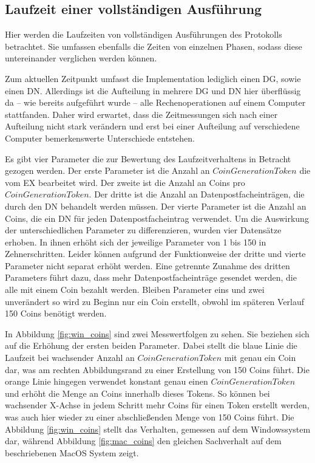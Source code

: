 \documentclass[
	fontsize=11pt,
	headings=small,
	parskip=half,           %
	bibliography=totoc,
	numbers=noenddot,       %
	open=any,               %
]{scrreprt}
\begin{document}
\subsection{Laufzeit einer vollständigen Ausführung}
\label{subsec:fullRuntime}
Hier werden die Laufzeiten von vollständigen Ausführungen des Protokolls betrachtet. Sie umfassen ebenfalls die Zeiten von einzelnen Phasen, sodass diese untereinander verglichen werden können.

Zum aktuellen Zeitpunkt umfasst die Implementation lediglich einen DG, sowie einen DN. Allerdings ist die Aufteilung in mehrere DG und DN hier überflüssig da -- wie bereits aufgeführt wurde -- alle Rechenoperationen auf einem Computer stattfanden. Daher wird erwartet, dass die Zeitmessungen sich nach einer Aufteilung nicht stark verändern und erst bei einer Aufteilung auf verschiedene Computer bemerkenswerte Unterschiede entstehen.

Es gibt vier Parameter die zur Bewertung des Laufzeitverhaltens in Betracht gezogen werden. Der erste Parameter ist die Anzahl an $CoinGenerationToken$ die vom EX bearbeitet wird. Der zweite ist die Anzahl an Coins pro $CoinGenerationToken$. Der dritte ist die Anzahl an Datenpostfacheinträgen, die durch den DN behandelt werden müssen. Der vierte Parameter ist die Anzahl an Coins, die ein DN für jeden Datenpostfacheintrag verwendet. Um die Auswirkung der unterschiedlichen Parameter zu differenzieren, wurden vier Datensätze erhoben. In ihnen erhöht sich der jeweilige Parameter von 1 bis 150 in Zehnerschritten. Leider können aufgrund der Funktionweise der dritte und vierte Parameter nicht separat erhöht werden. Eine getrennte Zunahme des dritten Parameters führt dazu, dass mehr Datenpostfacheinträge gesendet werden, die alle mit einem Coin bezahlt werden. Bleiben Parameter eins und zwei unverändert so wird zu Beginn nur ein Coin erstellt, obwohl im späteren Verlauf 150 Coins benötigt werden.

In Abbildung \ref{fig:win_coins} sind zwei Messwertfolgen zu sehen. Sie beziehen sich auf die Erhöhung der ersten beiden Parameter. Dabei stellt die blaue Linie die Laufzeit bei wachsender Anzahl an $CoinGenerationToken$ mit genau ein Coin dar, was am rechten Abbildungsrand zu einer Erstellung von 150 Coins führt. Die orange Linie hingegen verwendet konstant genau einen $CoinGenerationToken$ und erhöht die Menge an Coins innerhalb dieses Tokens. So können bei wachsender X-Achse in jedem Schritt mehr Coins für einen Token erstellt werden, was auch hier wieder zu einer abschließenden Menge von 150 Coins führt. Die Abbildung \ref{fig:win_coins} stellt das Verhalten, gemessen auf dem Windowssystem dar, während Abbildung \ref{fig:mac_coins} den gleichen Sachverhalt auf dem beschriebenen MacOS System zeigt.
\end{document}
